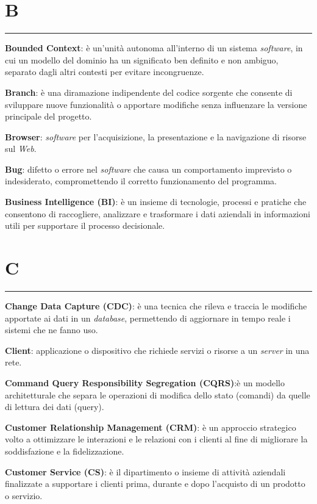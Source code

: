 \section*{B}
{\color{lightgray}\rule{\textwidth}{0.4pt}} %
\begin{glossaryitemize}
    \item \textbf{Bounded Context}: è un'unità autonoma all'interno di un sistema \textit{software}, in cui un modello del dominio ha un significato ben definito e non ambiguo, separato dagli altri contesti per evitare incongruenze.
    \item \textbf{Branch}: è una diramazione indipendente del codice sorgente che consente di sviluppare nuove funzionalità o apportare modifiche senza influenzare la versione principale del progetto.
    \item \textbf{Browser}: \textit{software} per l’acquisizione, la presentazione e la navigazione di risorse sul \textit{Web}.
    \item \textbf{Bug}: difetto o errore nel \textit{software} che causa un comportamento imprevisto o indesiderato, compromettendo il corretto funzionamento del programma.
    \item \textbf{Business Intelligence (BI)}: è un insieme di tecnologie, processi e pratiche che consentono di raccogliere, analizzare e trasformare i dati aziendali in informazioni utili per supportare il processo decisionale.
\end{glossaryitemize}

\section*{C}
{\color{lightgray}\rule{\textwidth}{0.4pt}} %
\begin{glossaryitemize}
    \item \textbf{Change Data Capture (CDC)}: è una tecnica che rileva e traccia le modifiche apportate ai dati in un \textit{database}, permettendo di aggiornare in tempo reale i sistemi che ne fanno uso.
    \item \textbf{Client}: applicazione o dispositivo che richiede servizi o risorse a un \textit{server} in una rete.
    \item \textbf{Command Query Responsibility Segregation (CQRS)}:è un modello architetturale che separa le operazioni di modifica dello stato (comandi) da quelle di lettura dei dati (query).
    \item \textbf{Customer Relationship Management (CRM)}: è un approccio strategico volto a ottimizzare le interazioni e le relazioni con i clienti al fine di migliorare la soddisfazione e la fidelizzazione.
    \item \textbf{Customer Service (CS)}: è il dipartimento o insieme di attività aziendali finalizzate a supportare i clienti prima, durante e dopo l'acquisto di un prodotto o servizio.
\end{glossaryitemize}

